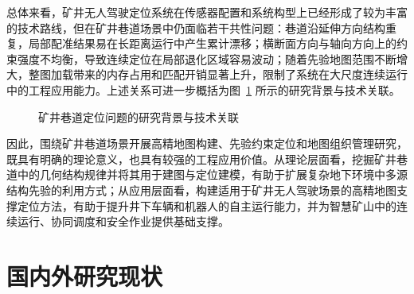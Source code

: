 总体来看，矿井无人驾驶定位系统在传感器配置和系统构型上已经形成了较为丰富的技术路线，但在矿井巷道场景中仍面临若干共性问题：巷道沿延伸方向结构重复，局部配准结果易在长距离运行中产生累计漂移；横断面方向与轴向方向上的约束强度不均衡，导致连续定位在局部退化区域容易波动；随着先验地图范围不断增大，整图加载带来的内存占用和匹配开销显著上升，限制了系统在大尺度连续运行中的工程应用能力。上述关系可进一步概括为图~\ref{fig:ch1_background_logic} 所示的研究背景与技术关联。

\begin{figure}[htbp]
    \centering
    \caption{矿井巷道定位问题的研究背景与技术关联}
    \label{fig:ch1_background_logic}
\end{figure}

因此，围绕矿井巷道场景开展高精地图构建、先验约束定位和地图组织管理研究，既具有明确的理论意义，也具有较强的工程应用价值。从理论层面看，挖掘矿井巷道中的几何结构规律并将其用于建图与定位建模，有助于扩展复杂地下环境中多源结构先验的利用方式；从应用层面看，构建适用于矿井无人驾驶场景的高精地图支撑定位方法，有助于提升井下车辆和机器人的自主运行能力，并为智慧矿山中的连续运行、协同调度和安全作业提供基础支撑。

\section{国内外研究现状}

